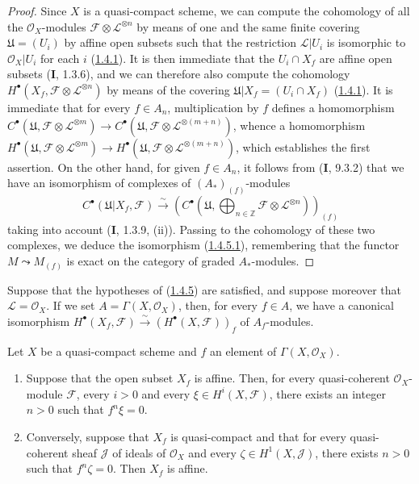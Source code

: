 \begin{proof}
Since $X$ is a quasi-compact scheme, we can compute the cohomology of
all the $\mathcal O_X$-modules
$\mathcal F\otimes\mathcal L^{\otimes n}$ by means of one and the same
finite covering $\mathfrak U=(U_i)$ by affine open subsets such that the
restriction $\mathcal L\vert U_i$ is isomorphic to $\mathcal O_X\vert U_i$
for each $i$ (\hyperref[III.1.4.1]{1.4.1}). It is then immediate that the
$U_i\cap X_f$ are affine open subsets (\textbf{I}, 1.3.6), and we can therefore also
compute the cohomology
$H^\bullet(X_f,\mathcal F\otimes\mathcal L^{\otimes n})$ by means of the
covering $\mathfrak U\vert X_f=(U_i\cap X_f)$
(\hyperref[III.1.4.1]{1.4.1}). It is immediate that for every $f\in A_n$,
multiplication by $f$ defines a homomorphism $C^\bullet(\mathfrak U,\mathcal F\otimes\mathcal L^{\otimes m})
\longrightarrow
C^\bullet(\mathfrak U,\mathcal F\otimes\mathcal L^{\otimes(m+n)})$,
whence a homomorphism $H^\bullet(\mathfrak U,\mathcal F\otimes\mathcal L^{\otimes m})
\longrightarrow
H^\bullet(\mathfrak U,\mathcal F\otimes\mathcal L^{\otimes(m+n)})$,
which establishes the first assertion. On the other hand, for given
$f\in A_n$, it follows from (\textbf{I}, 9.3.2) that we have an isomorphism of
complexes of $(A_*)_{(f)}$-modules
\[
C^\bullet(\mathfrak U\vert X_f,\mathcal F)
\xrightarrow{\sim}
\left(C^\bullet\left(\mathfrak U,
\bigoplus_{n\in\mathbb Z}\mathcal F\otimes\mathcal L^{\otimes n}
\right)\right)_{(f)}
\]
taking into account (\textbf{I}, 1.3.9, (ii)). Passing to the cohomology of these two
complexes, we deduce the isomorphism
(\hyperref[III.1.4.5.1]{1.4.5.1}), remembering that the functor
$M\leadsto M_{(f)}$ is exact on the category of graded
$A_*$-modules.
\end{proof}

\begin{corollary}[1.4.6]
\label{III.1.4.6}
Suppose that the hypotheses of
\textup{(\hyperref[III.1.4.5]{1.4.5})} are satisfied, and suppose moreover that
$\mathcal L=\mathcal O_X$. If we set $A=\Gamma(X,\mathcal O_X)$, then,
for every $f\in A$, we have a canonical isomorphism $H^\bullet(X_f,\mathcal F)
\xrightarrow{\sim}(H^\bullet(X,\mathcal F))_f$
of $A_f$-modules.
\end{corollary}

\begin{corollary}[1.4.7]
\label{III.1.4.7}
Let $X$ be a quasi-compact scheme and $f$ an element of
$\Gamma(X,\mathcal O_X)$.
\begin{enumerate}
\item[\textup{(i)}] Suppose that the open subset $X_f$ is affine. Then, for every
quasi-coherent $\mathcal O_X$-module $\mathcal F$, every $i>0$ and every
$\xi\in H^i(X,\mathcal F)$, there exists an integer $n>0$ such that $f^n\xi=0$.
\item[\textup{(ii)}] Conversely, suppose that $X_f$ is quasi-compact and that for
every quasi-coherent sheaf $\mathcal J$ of ideals of $\mathcal O_X$ and every
$\zeta\in H^1(X,\mathcal J)$, there exists $n>0$ such that $f^n\zeta=0$.
Then $X_f$ is affine.
\end{enumerate}
\end{corollary}

